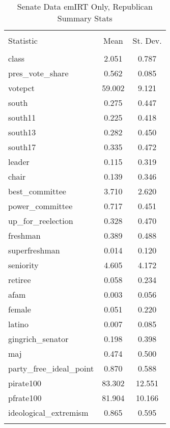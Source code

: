 \documentclass[12pt]{article}
\begin{document}
\begin{table}[!htbp] \centering 
	\label{} 
	\begin{tabular}{@{\extracolsep{5pt}}lcc} 
		\\[-1.8ex]\hline 
		\hline \\[-1.8ex] 
		Statistic & \multicolumn{1}{c}{Mean} & \multicolumn{1}{c}{St. Dev.} \\ 
		\hline \\[-1.8ex] 
		class & 2.051 & 0.787 \\ 
		pres\_vote\_share & 0.562 & 0.085 \\ 
		votepct & 59.002 & 9.121 \\ 
		south & 0.275 & 0.447 \\ 
		south11 & 0.225 & 0.418 \\ 
		south13 & 0.282 & 0.450 \\ 
		south17 & 0.335 & 0.472 \\ 
		leader & 0.115 & 0.319 \\ 
		chair & 0.139 & 0.346 \\ 
		best\_committee & 3.710 & 2.620 \\ 
		power\_committee & 0.717 & 0.451 \\ 
		up\_for\_reelection & 0.328 & 0.470 \\ 
		freshman & 0.389 & 0.488 \\ 
		superfreshman & 0.014 & 0.120 \\ 
		seniority & 4.605 & 4.172 \\ 
		retiree & 0.058 & 0.234 \\ 
		afam & 0.003 & 0.056 \\ 
		female & 0.051 & 0.220 \\ 
		latino & 0.007 & 0.085 \\ 
		gingrich\_senator & 0.198 & 0.398 \\ 
		maj & 0.474 & 0.500 \\ 
		party\_free\_ideal\_point & 0.870 & 0.588 \\ 
		pirate100 & 83.302 & 12.551 \\ 
		pfrate100 & 81.904 & 10.166 \\ 
		ideological\_extremism & 0.865 & 0.595 \\ 
		\hline \\[-1.8ex] 
	\end{tabular} 
	\caption{Senate Data emIRT Only, Republican Summary Stats}
\end{table} 
\end{document}
